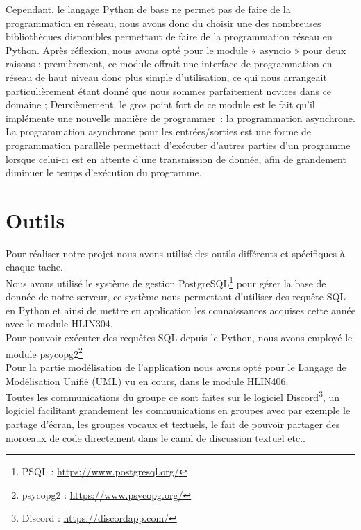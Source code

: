 \documentclass{report}
\begin{document}
Cependant, le langage Python de base ne permet pas de faire de la programmation en réseau, nous avons donc du choisir une des nombreuses bibliothèques disponibles permettant de faire de la programmation réseau en Python. Après réflexion, nous avons opté pour le module « asyncio » pour deux raisons : premièrement, ce module offrait une interface de programmation en réseau de haut niveau donc plus simple d'utilisation, ce qui nous arrangeait particulièrement étant donné que nous sommes parfaitement novices dans ce domaine ; Deuxièmement, le gros point fort de ce module est le fait qu'il implémente une nouvelle manière de programmer~: la programmation asynchrone. La programmation asynchrone pour les entrées/sorties est une forme de programmation parallèle permettant d'exécuter d'autres parties d'un programme lorsque celui-ci est en attente d'une transmission de donnée, afin de grandement diminuer le temps d'exécution du programme. \\

\section{Outils} %
Pour réaliser notre projet nous avons utilisé des outils différents et spécifiques à chaque tache. \\

Nous avons utilisé le système de gestion PostgreSQL\footnote{PSQL : \url{https://www.postgresql.org/}} pour gérer la base de donnée de notre serveur, ce système nous permettant d'utiliser des requête SQL en Python et ainsi de mettre en application les connaissances acquises cette année avec le module HLIN304. \\
Pour pouvoir exécuter des requêtes SQL depuis le Python, nous avons employé le module psycopg2\footnote{psycopg2 : \url{https://www.psycopg.org/}} \\

Pour la partie modélisation de l'application nous avons opté pour le Langage de Modélisation Unifié (UML) vu en cours, dans le module HLIN406. \\

Toutes les communications du groupe ce sont faites sur le logiciel Discord\footnote{Discord : \url{https://discordapp.com/}}, un logiciel facilitant grandement les communications en groupes avec par exemple le partage d'écran, les groupes vocaux et textuels, le fait de pouvoir partager des morceaux de code directement dans le canal de discussion textuel etc.. \\
\end{document}
